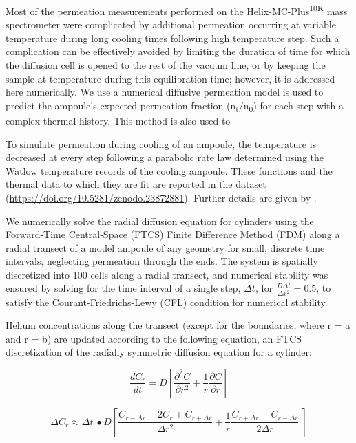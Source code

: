 Most of the permeation measurements performed on the Helix-MC-Plus\textsuperscript{10K} mass spectrometer were complicated 
by additional permeation occurring at variable temperature during long cooling times following high temperature step. 
Such a complication can be effectively avoided by limiting the duration of time for which the diffusion cell is opened to the 
rest of the vacuum line, or by keeping the sample at-temperature during this equilibration time; however, it is addressed
here numerically. We use a numerical diffusive permeation model is used to predict the ampoule's expected permeation fraction 
(n\textsubscript{t}/n\textsubscript{0}) for each step with a complex thermal history. This method is also used to

To simulate permeation during cooling of an ampoule, the temperature is
decreased at every step following a parabolic rate law determined using
the Watlow temperature records of the cooling ampoule. These functions and
the thermal data to which they are fit are reported in the dataset (\url{https://doi.org/10.5281/zenodo.23872881}). 
Further details are given by \citet{thyer2026thesis}.

We numerically solve the radial diffusion equation for cylinders using the Forward-Time Central-Space (FTCS) Finite Difference
Method (FDM) along a radial transect of a model ampoule of any
geometry for small, discrete time intervals, neglecting permeation through the ends. The system is spatially
discretized into 100 cells along a radial transect, and numerical
stability was ensured by solving for the time interval of a single step,
$\Delta t$, for \(\frac{D\Delta t}{\Delta x^{2}} = 0.5\), to satisfy the
Courant-Friedrichs-Lewy (CFL) condition for numerical stability.

Helium concentrations along the transect (except for the boundaries,
where r = a and r = b) are updated according to the following equation,
an FTCS discretization of the radially symmetric diffusion equation for
a cylinder:

\[\frac{dC_{r}}{dt} = D\left\lbrack \frac{\partial^{2}C}{\partial r^{2}} + \frac{1}{r}\frac{\partial C}{\partial r} \right\rbrack\]

\begin{equation}
\Delta C_{r} \approx \Delta t\  \bullet D\left\lbrack \frac{C_{r - \Delta r} - 2C_{r} + C_{r + \Delta r}}{\Delta r^{2}} + \frac{1}{r}\frac{C_{r + \Delta r} - C_{r - \Delta r}}{2\Delta r}\  \right\rbrack
\label{eq:s5-0}
\end{equation}

